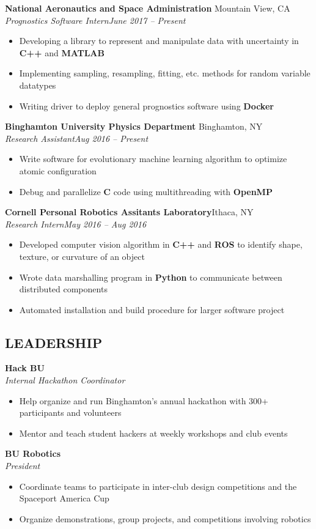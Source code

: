 \documentclass[10pt]{article}
\begin{document}
\textbf{National Aeronautics and Space Administration} \hfill Mountain View, CA \\ 
\textit{Prognostics Software Intern}\hfill \textit{June 2017 – Present}
\begin{itemize}
	\item Developing a library to represent and manipulate data with uncertainty in \textbf{C++} and \textbf{MATLAB}
	\item Implementing sampling, resampling, fitting, etc. methods for random variable datatypes
	\item Writing driver to deploy general prognostics software using \textbf{Docker}
\end{itemize}
\ssubsecspace
\textbf{Binghamton University Physics Department} \hfill Binghamton, NY \\
\textit{Research Assistant}\hfill \textit{Aug 2016 – Present}
\begin{itemize}
	\item Write software for evolutionary machine learning algorithm to optimize atomic configuration
	\item Debug and parallelize \textbf{C} code using multithreading with \textbf{OpenMP}
\end{itemize}
\ssubsecspace
\textbf{Cornell Personal Robotics Assitants Laboratory}\hfill Ithaca, NY \\
\textit{Research Intern}\hfill \textit{May 2016 – Aug 2016}
\begin{itemize}
	\item Developed computer vision algorithm in \textbf{C++} and \textbf{ROS} to identify shape, texture, or curvature of an object
	\item Wrote data marshalling program in \textbf{Python} to communicate between distributed components
	\item Automated installation and build procedure for larger software project
\end{itemize}
\subsecspace
\subsection*{LEADERSHIP}
\spacedhrule{-0.1em}{0.5em}

\textbf{Hack BU} \\
\textit{Internal Hackathon Coordinator}
\begin{itemize}
	\item Help organize and run Binghamton's annual hackathon with 300+ participants and volunteers
	\item Mentor and teach student hackers at weekly workshops and club events
\end{itemize}
\ssubsecspace
\textbf{BU Robotics}\\
\textit{President}
\begin{itemize}
	\item Coordinate teams to participate in inter-club design competitions and the Spaceport America Cup
	\item Organize demonstrations, group projects, and competitions involving robotics
\end{itemize}
\subsecspace
\end{document}
